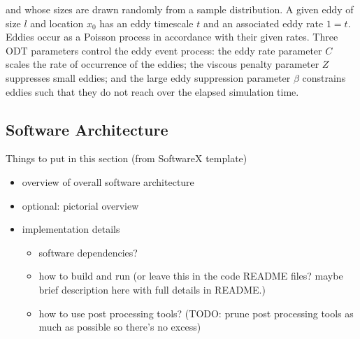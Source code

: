 \documentclass[preprint,12pt, a4paper]{elsarticle}
\begin{document}
 and whose sizes are drawn randomly from a sample distribution. A given eddy of size $l$ and location $x_0$ has an eddy timescale $t$ and an associated eddy rate $1=t$. Eddies occur as a Poisson process in accordance with their given rates. Three ODT parameters control the eddy event process: the eddy rate parameter $C$ scales the rate of occurrence of the eddies; the viscous penalty parameter $Z$ suppresses small eddies; and the large eddy suppression parameter $\beta$ constrains eddies such that they do not reach over the elapsed simulation time. 

\subsection{Software Architecture}
\label{sub:architecture}

Things to put in this section (from SoftwareX template)
\begin{itemize}
	\item overview of overall software architecture
	\item optional: pictorial overview
	\item implementation details
	\begin{itemize}
		\item software dependencies?
		\item how to build and run (or leave this in the code README files? maybe brief description here with full details in README.)
		\item how to use post processing tools? (TODO: prune post processing tools as much as possible so there's no excess)
	\end{itemize}
\end{itemize}
\end{document}
